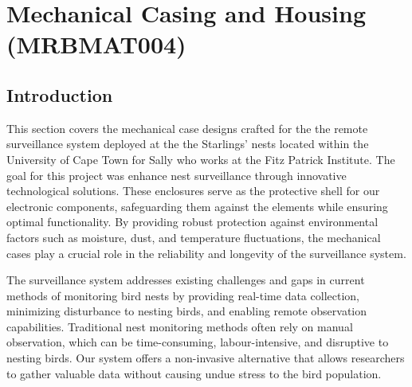 \documentclass[class=report,11pt,crop=false]{standalone}
\begin{document}
\ifstandalone
\tableofcontents
\fi
\chapter{ Mechanical Casing and Housing (MRBMAT004)\label{ch:literature}}

\section{Introduction}
This section covers the mechanical case designs crafted for the the remote surveillance system deployed at the the Starlings’ nests located within the University of Cape Town for Sally who works at the Fitz Patrick Institute. The goal for this project was enhance nest surveillance through innovative technological solutions. These enclosures serve as the protective shell for our electronic components, safeguarding them against the elements while ensuring optimal functionality. By providing robust protection against environmental factors such as moisture, dust, and temperature fluctuations, the mechanical cases play a crucial role in the reliability and longevity of the surveillance system.
\newline

The surveillance system addresses existing challenges and gaps in current methods of monitoring bird nests by providing real-time data collection, minimizing disturbance to nesting birds, and enabling remote observation capabilities. Traditional nest monitoring methods often rely on manual observation, which can be time-consuming, labour-intensive, and disruptive to nesting birds. Our system offers a non-invasive alternative that allows researchers to gather valuable data without causing undue stress to the bird population.
\newline
\end{document}
